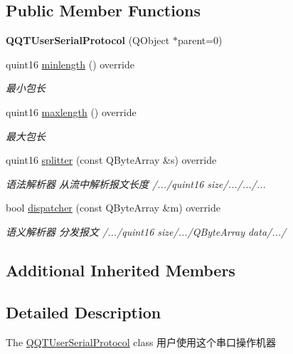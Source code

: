 \subsection*{Public Member Functions}
\begin{DoxyCompactItemize}
\item 
\mbox{\label{class_q_q_t_user_serial_protocol_a7a95f9ff4d149d0f2bc940c233000e52}} 
{\bfseries Q\+Q\+T\+User\+Serial\+Protocol} (Q\+Object $\ast$parent=0)
\item 
quint16 \mbox{\hyperlink{class_q_q_t_user_serial_protocol_a7dcd4e05381634dd45504571243ea853}{minlength}} () override
\begin{DoxyCompactList}\small\item\em 最小包长 \end{DoxyCompactList}\item 
quint16 \mbox{\hyperlink{class_q_q_t_user_serial_protocol_ad564c1976be71019499ea1de4fd51a12}{maxlength}} () override
\begin{DoxyCompactList}\small\item\em 最大包长 \end{DoxyCompactList}\item 
quint16 \mbox{\hyperlink{class_q_q_t_user_serial_protocol_abcadcc53d378823ad87a0d736169fd3e}{splitter}} (const Q\+Byte\+Array \&s) override
\begin{DoxyCompactList}\small\item\em 语法解析器 从流中解析报文长度 /.../quint16 size/.../.../... \end{DoxyCompactList}\item 
bool \mbox{\hyperlink{class_q_q_t_user_serial_protocol_ac851e9026524ef8081f7980480d83237}{dispatcher}} (const Q\+Byte\+Array \&m) override
\begin{DoxyCompactList}\small\item\em 语义解析器 分发报文 /.../quint16 size/.../\+Q\+Byte\+Array data/.../ \end{DoxyCompactList}\end{DoxyCompactItemize}
\subsection*{Additional Inherited Members}


\subsection{Detailed Description}
The \mbox{\hyperlink{class_q_q_t_user_serial_protocol}{Q\+Q\+T\+User\+Serial\+Protocol}} class 用户使用这个串口操作机器 

